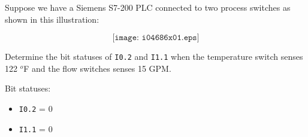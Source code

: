

Suppose we have a Siemens S7-200 PLC connected to two process switches as shown in this illustration:

$$\texttt{[image: i04686x01.eps]}$$

Determine the bit statuses of {\tt I0.2} and {\tt I1.1} when the temperature switch senses 122 $^{o}$F and the flow switches senses 15 GPM.







Bit statuses:

\begin{itemize}
\item{} {\tt I0.2} = 0
\item{} {\tt I1.1} = 0
\end{itemize}











